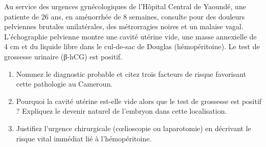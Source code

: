 \documentclass[11pt]{article}
\begin{document}
\begin{exercice}
Au service des urgences gynécologiques de l'Hôpital Central de Yaoundé, une patiente de 26 ans, en aménorrhée de 8 semaines, consulte pour des douleurs pelviennes brutales unilatérales, des métrorragies noires et un malaise vagal. L'échographie pelvienne montre une cavité utérine vide, une masse annexielle de 4 cm et du liquide libre dans le cul-de-sac de Douglas (hémopéritoine). Le test de grossesse urinaire (β-hCG) est positif.
\begin{enumerate}
    \item Nommez le diagnostic probable et citez trois facteurs de risque favorisant cette pathologie au Cameroun.
    \item Pourquoi la cavité utérine est-elle vide alors que le test de grossesse est positif ? Expliquez le devenir naturel de l'embryon dans cette localisation.
    \item Justifiez l'urgence chirurgicale (cœlioscopie ou laparotomie) en décrivant le risque vital immédiat lié à l'hémopéritoine.
\end{enumerate}
\end{exercice}
\end{document}
